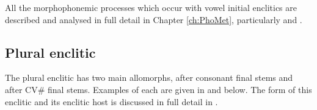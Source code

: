 \begin{exe}
	\label{ex:VaCVbr+=V->VaVaCb=V -2}
\end{exe}

All the morphophonemic processes which occur with vowel initial
enclitics are described and analysed
in full detail in Chapter \ref{ch:PhoMet},
particularly  and .

\subsection{Plural enclitic}\label{sec:PluEnc2}
The plural enclitic has two main allomorphs,
 after consonant final stems
and  after CV{\#} final stems.
Examples of each are given in 
and  below.
The form of this enclitic and its enclitic host
is discussed in full detail in .

